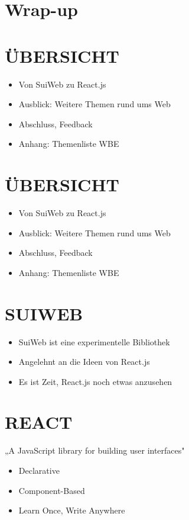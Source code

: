 \section{Wrap-up}

\section*{ÜBERSICHT}
\begin{itemize}
  \item Von SuiWeb zu React.js
  \item Ausblick: Weitere Themen rund ums Web
  \item Abschluss, Feedback
  \item Anhang: Themenliste WBE
\end{itemize}

\section*{ÜBERSICHT}
\begin{itemize}
  \item Von SuiWeb zu React.js
  \item Ausblick: Weitere Themen rund ums Web
  \item Abschluss, Feedback
  \item Anhang: Themenliste WBE
\end{itemize}

\section*{SUIWEB}
\begin{itemize}
  \item SuiWeb ist eine experimentelle Bibliothek
  \item Angelehnt an die Ideen von React.js
  \item Es ist Zeit, React.js noch etwas anzusehen
\end{itemize}

\section*{REACT}
„A JavaScript library for building user interfaces"

\begin{itemize}
  \item Declarative
  \item Component-Based
  \item Learn Once, Write Anywhere
\end{itemize}


